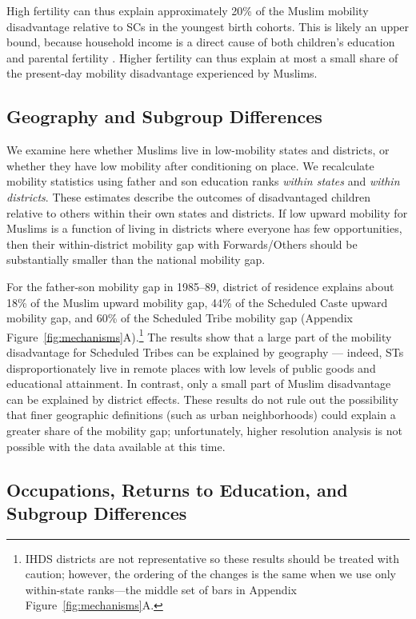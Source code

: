 \documentclass[12pt,letterpaper]{article}
\numberwithin{equation}{section}
\begin{document}
High fertility can thus explain approximately 20\% of the Muslim mobility disadvantage relative to SCs in the youngest birth cohorts. This is likely an upper bound, because household income is a direct cause of both children's education and parental fertility \cite{schultz2003}. Higher fertility can thus explain at most a small share of the present-day mobility disadvantage experienced by Muslims.

\subsection{Geography and Subgroup Differences}

We examine here whether Muslims live in low-mobility states and districts, or whether they have low mobility after conditioning on place. We recalculate mobility statistics using father and son education ranks \textit{within states} and \textit{within districts}. These estimates describe the outcomes of disadvantaged children relative to others within their own states and districts. If low upward mobility for Muslims is a function of living in districts where everyone has few opportunities, then their within-district mobility gap with Forwards/Others should be substantially smaller than the national mobility gap.

For the father-son mobility gap in 1985--89, district of residence explains about 18\% of the Muslim upward mobility gap, 44\% of the Scheduled Caste upward mobility gap, and 60\% of the Scheduled Tribe mobility gap (Appendix Figure~\ref{fig:mechanisms}A).\footnote{IHDS districts are not representative so these results should be treated with caution; however, the ordering of the changes is the same when we use only within-state ranks---the middle set of bars in Appendix Figure~\ref{fig:mechanisms}A.} The results show that a large part of the mobility disadvantage for Scheduled Tribes can be explained by geography --- indeed, STs disproportionately live in remote places with low levels of public goods and educational attainment. In contrast, only a small part of Muslim disadvantage can be explained by district effects. These results do not rule out the possibility that finer geographic definitions (such as urban neighborhoods) could explain a greater share of the mobility gap; unfortunately, higher resolution analysis is not possible with the data available at this time.

\subsection{Occupations, Returns to Education, and Subgroup Differences}
\end{document}
